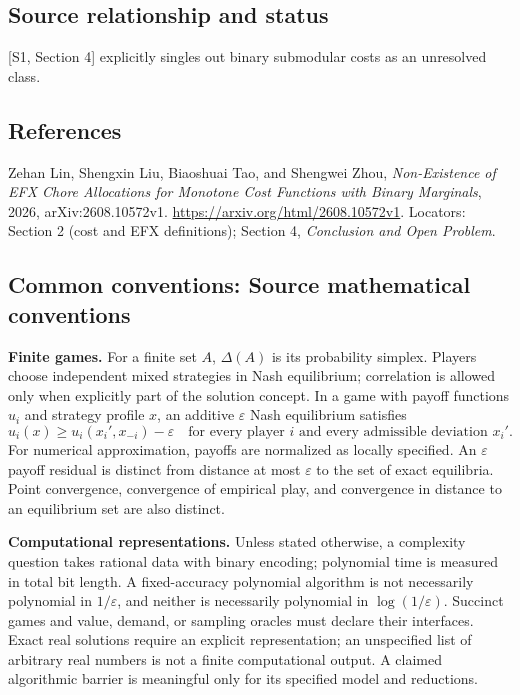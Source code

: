 \documentclass[11pt,a4paper]{article}
\begin{document}
\subsection*{Source relationship and status}
[S1, Section 4] explicitly singles out binary submodular costs as an
unresolved class.

\subsection*{References}
\begingroup\footnotesize\raggedright
\noindent[S1] Zehan Lin, Shengxin Liu, Biaoshuai Tao, and Shengwei Zhou,
\emph{Non-Existence of EFX Chore Allocations for Monotone Cost Functions
with Binary Marginals}, 2026, arXiv:2608.10572v1.
\url{https://arxiv.org/html/2608.10572v1}.
Locators: Section 2 (cost and EFX definitions);
Section 4, \emph{Conclusion and Open Problem}.
\par\endgroup

\subsection*{Common conventions: Source mathematical conventions}

\textbf{Finite games.} For a finite set $A$, $\Delta(A)$ is its probability
simplex. Players choose independent mixed strategies in Nash equilibrium;
correlation is allowed only when explicitly part of the solution concept.
In a game with payoff functions $u_i$ and strategy profile $x$, an additive
$\varepsilon$ Nash equilibrium satisfies
\[
 u_i(x)\geq u_i(x_i',x_{-i})-\varepsilon
 \quad\text{for every player $i$ and every admissible deviation $x_i'$}.
\]
For numerical approximation, payoffs are normalized as locally specified.
An $\varepsilon$ payoff residual is distinct from distance at most
$\varepsilon$ to the set of exact equilibria. Point convergence, convergence
of empirical play, and convergence in distance to an equilibrium set are
also distinct.

\textbf{Computational representations.} Unless stated otherwise, a complexity
question takes rational data with binary encoding; polynomial time is measured
in total bit length. A fixed-accuracy polynomial algorithm is not necessarily
polynomial in $1/\varepsilon$, and neither is necessarily polynomial in
$\log(1/\varepsilon)$. Succinct games and value, demand, or sampling oracles
must declare their interfaces. Exact real solutions require an explicit
representation; an unspecified list of arbitrary real numbers is not a
finite computational output. A claimed algorithmic barrier is meaningful
only for its specified model and reductions.
\end{document}

